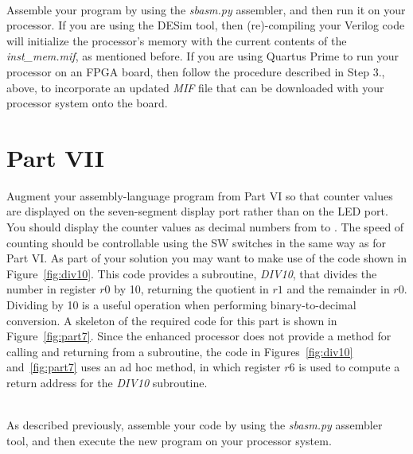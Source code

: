 \documentclass[epsfig,10pt,fullpage]{article} \addtolength{\textwidth}{1.5in}
\newcommand{\red}[1]{{\color{red}\sf{#1}}}
\begin{document}
~\\
\noindent
Assemble your program by using the {\it sbasm.py} assembler, and then run it on
your processor. If you are using the DESim tool, then (re)-compiling your Verilog code will
initialize the processor's memory with the current contents of the {\it inst\_mem.mif}, 
as mentioned before. 
If you are using Quartus Prime to run your processor on an FPGA board, then follow the 
procedure described in Step 3., above, to incorporate an updated {\it MIF} file that can
be downloaded with your processor system onto the board.

\section*{Part VII}
Augment your assembly-language program from Part VI so that counter values are displayed
on the seven-segment display port rather than on the LED port. You should display the
counter values as decimal numbers from \texttt{\red{0}} to \texttt{\red{65535}}.
The speed of counting should be controllable using the SW switches in the same way as for
Part VI. As part of your solution you may want to make use of the code shown in 
Figure~\ref{fig:div10}. This code provides a subroutine, {\it DIV10}, that divides the number in
register $r0$ by 10, returning the quotient in $r1$ and the remainder in $r0$. 
Dividing by 10 is a useful operation when performing binary-to-decimal conversion. 
A skeleton of the required code for this part is shown in Figure~\ref{fig:part7}.
Since the enhanced processor does not provide a method for calling and returning from a
subroutine, the code in Figures~\ref{fig:div10} and~\ref{fig:part7} uses an ad hoc method,
in which register $r6$ is used to compute a return address for the {\it DIV10} subroutine.

~\\
\noindent
As described previously, assemble your code by using the {\it sbasm.py} assembler tool, 
and then execute the new program on your processor system.
\end{document}
